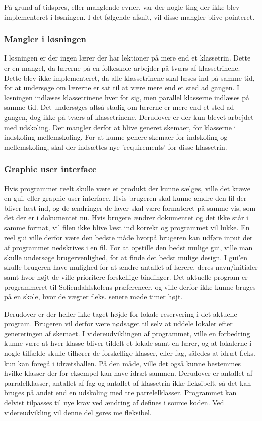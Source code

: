 På grund af tidspres, eller manglende evner, var der nogle ting der ikke blev implementeret i løsningen. I det følgende afsnit, vil disse mangler blive pointeret. 
\subsubsection{Mangler i løsningen}

I løsningen er der ingen lærer der har lektioner på mere end et klassetrin. Dette er en mangel, da lærerne på en folkeskole arbejder på tværs af klassetrinene. Dette blev ikke implementeret, da alle klassetrinene skal læses ind på samme tid, for at undersøge om lærerne er sat til at være mere end et sted ad gangen. I løsningen indlæses klassetrinene hver for sig, men parallel klasserne indlæses på samme tid. Det undersøges altså stadig om lærerne er mere end et sted ad gangen, dog ikke på tværs af klassetrinene. 
Derudover er der kun blevet arbejdet med udskoling. Der mangler derfor at blive generet skemaer, for klasserne i indskoling mellemskoling. For at kunne genere skemaer for indskoling og mellemskoling, skal der indsættes nye ’requirements’ for disse klassetrin.
\subsubsection{Graphic user interface}

Hvis programmet reelt skulle være et produkt der kunne sælges, ville det kræve en gui, eller graphic user interface. Hvis brugeren skal kunne ændre den fil der bliver læst ind, og de ændringer de laver skal være formateret på samme vis, som det der er i dokumentet nu. Hvis brugere ændrer dokumentet og det ikke står i samme format, vil filen ikke blive læst ind korrekt og programmet vil lukke. En reel gui ville derfor være den bedste måde hvorpå brugeren kan udføre input der af programmet nedskrives i en fil. For at opstille den bedst mulige gui, ville man skulle undersøge brugervenlighed, for at finde det bedst mulige design. I gui’en skulle brugeren have mulighed for at ændre antallet af lærere, deres navn/initialer samt hvor højt de ville prioritere forskellige bindinger. 
Det aktuelle program er programmeret til Sofiendahlskolens præferencer, og ville derfor ikke kunne bruges på en skole, hvor de vægter f.eks. senere møde timer højt. 


Derudover er der heller ikke taget højde for lokale reservering i det aktuelle program. Brugeren vil derfor være nødsaget til selv at uddele lokaler efter genereringen af skemaet. I videreudviklingen af programmet, ville en forbedring kunne være at hver klasse bliver tildelt et lokale samt en lærer, og at lokalerne i nogle tilfælde skulle tilhører de forskellige klasser, eller fag, således at idræt f.eks. kun kan foregå i idrætshallen. På den måde, ville det også kunne bestemmes hvilke klasser der for eksempel kan have idræt sammen. Derudover er antallet af parralelklasser, antallet af fag og antallet af klassetrin ikke fleksibelt, så det kan bruges på andet end en udskoling med tre parrelelklasser. Programmet kan delvist tilpasses til nye krav ved ændring af defines i source koden. Ved videreudvikling vil denne del gøres me fleksibel.


